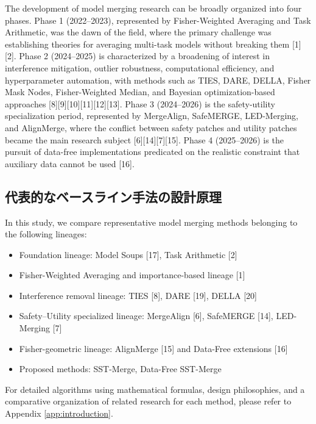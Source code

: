 \documentclass{article}
\begin{document}
The development of model merging research can be broadly organized into four phases. Phase 1 (2022--2023), represented by Fisher-Weighted Averaging and Task Arithmetic, was the dawn of the field, where the primary challenge was establishing theories for averaging multi-task models without breaking them [1][2]. Phase 2 (2024--2025) is characterized by a broadening of interest in interference mitigation, outlier robustness, computational efficiency, and hyperparameter automation, with methods such as TIES, DARE, DELLA, Fisher Mask Nodes, Fisher-Weighted Median, and Bayesian optimization-based approaches [8][9][10][11][12][13]. Phase 3 (2024--2026) is the safety-utility specialization period, represented by MergeAlign, SafeMERGE, LED-Merging, and AlignMerge, where the conflict between safety patches and utility patches became the main research subject [6][14][7][15]. Phase 4 (2025--2026) is the pursuit of data-free implementations predicated on the realistic constraint that auxiliary data cannot be used [16].


\subsection{代表的なベースライン手法の設計原理}
In this study, we compare representative model merging methods belonging to the following lineages:
\begin{itemize}
    \item Foundation lineage: Model Soups [17], Task Arithmetic [2]
    \item Fisher-Weighted Averaging and importance-based lineage [1]
    \item Interference removal lineage: TIES [8], DARE [19], DELLA [20]
    \item Safety--Utility specialized lineage: MergeAlign [6], SafeMERGE [14], LED-Merging [7]
    \item Fisher-geometric lineage: AlignMerge [15] and Data-Free extensions [16]
    \item Proposed methods: SST-Merge, Data-Free SST-Merge
\end{itemize}
For detailed algorithms using mathematical formulas, design philosophies, and a comparative organization of related research for each method, please refer to Appendix \ref{app:introduction}.
\end{document}
